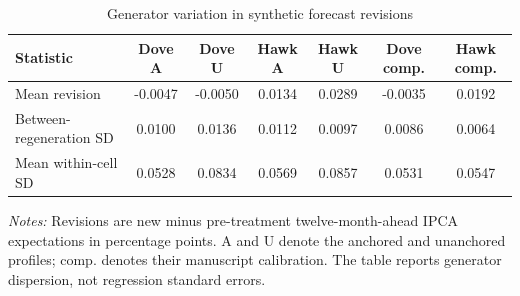 \begin{table}[htbp]
\color{revisionred}
\centering
\begin{threeparttable}
\caption{Generator variation in synthetic forecast revisions}
\label{tab:crossdraw-revisions}
\begin{scriptsize}
\setlength{\tabcolsep}{2.1pt}
\begin{tabular}{lcccccc}
\toprule
Statistic & Dove A & Dove U & Hawk A & Hawk U & Dove comp. & Hawk comp. \\
\midrule
Mean revision & -0.0047 & -0.0050 & 0.0134 & 0.0289 & -0.0035 & 0.0192 \\
Between-regeneration SD & 0.0100 & 0.0136 & 0.0112 & 0.0097 & 0.0086 & 0.0064 \\
Mean within-cell SD & 0.0528 & 0.0834 & 0.0569 & 0.0857 & 0.0531 & 0.0547 \\
\bottomrule
\end{tabular}
\begin{tablenotes}[flushleft]
\scriptsize
\item \textit{Notes:} Revisions are new minus pre-treatment twelve-month-ahead IPCA expectations in percentage points. A and U denote the anchored and unanchored profiles; comp. denotes their manuscript calibration. The table reports generator dispersion, not regression standard errors.
\end{tablenotes}
\end{scriptsize}
\end{threeparttable}
\end{table}
